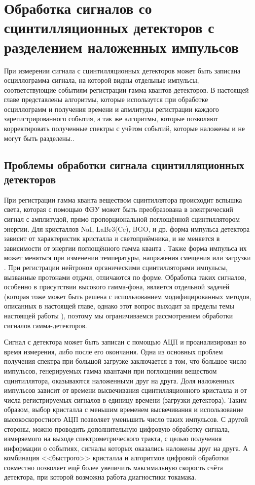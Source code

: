 \chapter{Обработка сигналов со сцинтилляционных детекторов с разделением наложенных импульсов}
\label{ch:ch2}

При измерении сигнала с сцинтилляционных детекторов может быть записана осциллограмма сигнала, на которой видны отдельные импульсы, соответствующие событиям регистрации гамма квантов детекторов. В настоящей главе представлены алгоритмы, которые использутся при обработке осциллограмм и получения времени и апмлитуды регистрации каждого зарегистрированного события, а так же алгоритмы, которые позволяют корректировать полученные спектры с учётом событий, которые наложены и не могут быть разделены..


\section{Проблемы обработки сигнала сцинтилляционных детекторов}

При регистрации гамма кванта веществом сцинтиллятора происходит вспышка света, которая с помощью ФЭУ может быть преобразована в электрический сигнал с амплитудой, прямо пропорциональной поглощённой сцинтиллятором энергии. Для кристаллов NaI, LaBr3(Ce), BGO, и др. форма импульса детектора зависит от характеристик кристалла и светоприёмника, и не меняется в зависимости от энергии поглощённого гамма кванта \cite{Gin2008}. Также форма импульса их может меняться при изменении температуры, напряжения смещения или загрузки \cite{Renker2009,Grodzicka2015}. При регистрации нейтронов органическими сцинтилляторами импульсы, вызванные протонами отдачи, отличаются по форме.  Обработка таких сигналов, особенно в присутствии высокого гамма-фона, является отдельной задачей (которая тоже может быть решена с использованием модифицированных методов, описанных в настоящей главе, однако этот вопрос выходит за пределы темы настоящей работы \cite{Iliasova2020}), поэтому мы ограничиваемся рассмотрением обработки сигналов гамма-детекторов. 

Сигнал с детектора может быть записан с помощью АЦП и проанализирован во время измерения, либо после его окончания. Одна из основных проблем получения спектра при большой загрузке заключается в том, что большое число импульсов, генерируемых гамма квантами при поглощении веществом сцинтиллятора, оказываются наложенными друг на друга. Доля наложенных импульсов зависит от времени высвечивания сцинтилляционного кристалла и от числа регистрируемых сигналов в единицу времени (загрузки детектора). Таким образом, выбор кристалла с меньшим временем высвечивания и использование высокоскоростного АЦП позволяет уменьшить число таких импульсов. С другой стороны, можно проводить дополнительную цифровую обработку сигнала, измеряемого на выходе спектрометрического тракта, с целью получения информации о событиях, сигналы которых оказались наложены друг на друга. А комбинация <<быстрого>> кристалла и алгоритмов цифровой обработки совместно позволяет ещё более увеличить максимальную скорость счёта детектора, при которой возможна работа диагностики токамака.

